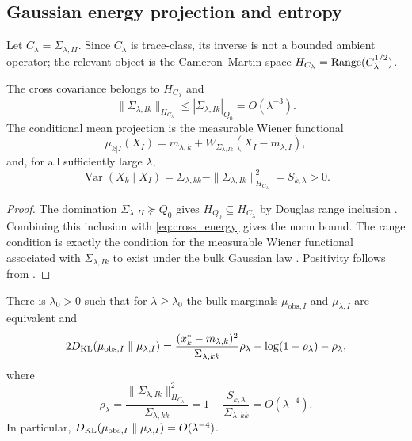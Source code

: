 \subsection{Gaussian energy projection and entropy}

Let $C_\lambda=\Sigma_{\lambda,II}$.  Since $C_\lambda$ is trace-class, its
inverse is not a bounded ambient operator; the relevant object is the
Cameron--Martin space $H_{C_\lambda}=\operatorname{Range}(C_\lambda^{1/2})$.

\begin{lemma}
\label{lem:conditional_predictor}
The cross covariance belongs to $H_{C_\lambda}$ and
\[
  \|\Sigma_{\lambda,Ik}\|_{H_{C_\lambda}}
  \le |\Sigma_{\lambda,Ik}|_{Q_0}=O(\lambda^{-3}).
\]
The conditional mean projection is the measurable Wiener functional
\[
  \mu_{k|I}(X_I)
  =
  m_{\lambda,k}
  +W_{\Sigma_{\lambda,Ik}}(X_I-m_{\lambda,I}),
\]
and, for all sufficiently large $\lambda$,
\[
  \operatorname{Var}(X_k\mid X_I)
  =
  \Sigma_{\lambda,kk}
  -\|\Sigma_{\lambda,Ik}\|_{H_{C_\lambda}}^2
  =S_{k,\lambda}>0.
\]
\end{lemma}

\begin{proof}
The domination $\Sigma_{\lambda,II}\succeq Q_0$ gives
$H_{Q_0}\subseteq H_{C_\lambda}$ by Douglas range inclusion
\cite{douglas1966majorization}.  Combining this inclusion with
\eqref{eq:cross_energy} gives the norm bound.  The range condition is exactly
the condition for the measurable Wiener functional associated with
$\Sigma_{\lambda,Ik}$ to exist under the bulk Gaussian law
\cite{bogachev1998gaussian}.  Positivity follows from
.
\end{proof}

\begin{lemma}
\label{lem:feldman_hajek}
There is $\lambda_0>0$ such that for $\lambda\ge\lambda_0$ the bulk marginals
$\mu_{\mathrm{obs},I}$ and $\mu_{\lambda,I}$ are equivalent and
\[
  2D_{\operatorname{KL}}(\mu_{\mathrm{obs},I}\parallel\mu_{\lambda,I})
  =
  \frac{(x_k^*-m_{\lambda,k})^2}{\Sigma_{\lambda,kk}}\rho_\lambda
  -\log(1-\rho_\lambda)-\rho_\lambda,
\]
where
\[
  \rho_\lambda
  =
  \frac{\|\Sigma_{\lambda,Ik}\|_{H_{C_\lambda}}^2}
       {\Sigma_{\lambda,kk}}
  =
  1-\frac{S_{k,\lambda}}{\Sigma_{\lambda,kk}}
  =O(\lambda^{-4}).
\]
In particular,
$D_{\operatorname{KL}}(\mu_{\mathrm{obs},I}\parallel\mu_{\lambda,I})=O(\lambda^{-4})$.
\end{lemma}

